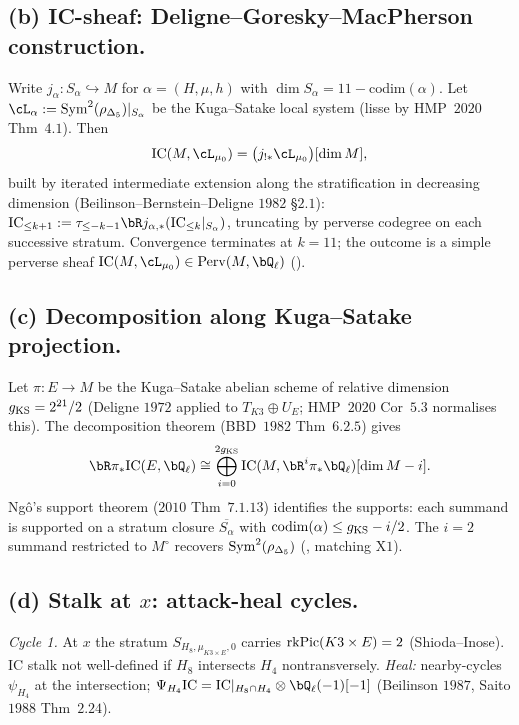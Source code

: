 \subsection*{(b) IC-sheaf: Deligne--Goresky--MacPherson construction.}

Write $j_\alpha:S_\alpha\hookrightarrow M$ for $\alpha=(H,\mu,h)$ with
$\dim S_\alpha=11-\mathrm{codim}(\alpha)$. Let
$\cL_\alpha:=\Sym^2(\rho_{\Delta_5})|_{S_\alpha}$ be the
Kuga--Satake local system (lisse by HMP~$2020$ Thm~$4.1$). Then
\begin{equation}
\label{wn:eq:kap-a4-IC-deligne}
\IC(M,\cL_{\mu_0})=\big(j_{!*}\cL_{\mu_0}\big)[\dim M],
\end{equation}
built by iterated intermediate extension along the stratification in
decreasing dimension (Beilinson--Bernstein--Deligne $1982$ \S$2.1$):
$\IC_{\leq k+1}:=\tau_{\leq -k-1}\bR j_{\alpha,*}(\IC_{\leq k}
|_{S_\alpha})$, truncating by perverse codegree on each successive
stratum. Convergence terminates at $k=11$; the outcome is a
simple perverse sheaf $\IC(M,\cL_{\mu_0})\in\Perv(M,\bQ_\ell)$
(\ClaimStatusTheorem).

\subsection*{(c) Decomposition along Kuga--Satake projection.}

Let $\pi:E\to M$ be the Kuga--Satake abelian scheme of relative
dimension $g_{\mathrm{KS}}=2^{21}/2$ (Deligne $1972$ applied to $T_{K3}\oplus
U_E$; HMP~$2020$ Cor~$5.3$ normalises this). The decomposition
theorem (BBD~$1982$ Thm~$6.2.5$) gives
\begin{equation}
\label{wn:eq:kap-a4-decomp}
\bR\pi_*\IC(E,\bQ_\ell)\cong\bigoplus_{i=0}^{2g_{\KS}}\IC(M,\bR^i\pi_*\bQ_\ell)[\dim M-i].
\end{equation}
Ngô's support theorem ($2010$ Thm~$7.1.13$) identifies the supports:
each summand is supported on a stratum closure $\overline{S_\alpha}$
with $\mathrm{codim}(\alpha)\leq g_{\mathrm{KS}}-i/2$. The $i=2$ summand
restricted to $M^\circ$ recovers $\mathrm{Sym}^2(\rho_{\Delta_5})$
(\ClaimStatusTheorem, matching X$1$).

\subsection*{(d) Stalk at $x$: attack-heal cycles.}

\emph{Cycle 1.} At $x$ the stratum $S_{H_8,\mu_{K3\times E},0}$
carries $\mathrm{rk}\mathrm{Pic}(K3\times E)=2$ (Shioda--Inose). IC stalk not
well-defined if $H_8$ intersects $H_4$ nontransversely. \emph{Heal:}
nearby-cycles $\psi_{H_4}$ at the intersection;
$\psi_{H_4}\IC=\IC|_{H_8\cap H_4}\otimes\bQ_\ell(-1)[-1]$
(Beilinson $1987$, Saito $1988$ Thm~$2.24$).

